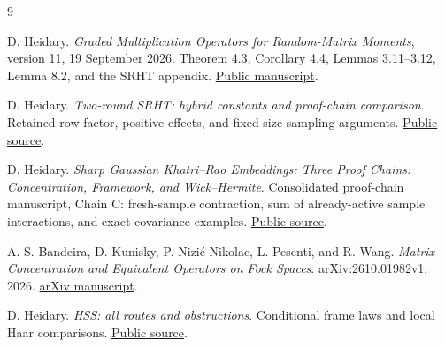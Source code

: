 \documentclass[11pt,a4paper]{article}
\theoremstyle{definition}\newtheorem{definition}[theorem]{Definition}
\theoremstyle{remark}\newtheorem{remark}[theorem]{Remark}
\numberwithin{equation}{section}
\begin{document}
\begin{thebibliography}{9}
D. Heidary.
\emph{Graded Multiplication Operators for Random-Matrix Moments},
version 11, 19 September 2026.
Theorem 4.3, Corollary 4.4, Lemmas 3.11--3.12, Lemma 8.2,
and the SRHT appendix.
\href{https://github.com/DiarHaidary/Results/blob/3a93d33c8b80326615b5b6e63654f3d84edf431d/Graded\%20Multiplication\%20Operators\%20for\%20Random-Matrix\%20Moments.pdf}{Public manuscript}.

D. Heidary.
\emph{Two-round SRHT: hybrid constants and proof-chain comparison}.
Retained row-factor, positive-effects, and fixed-size sampling arguments.
\href{https://github.com/DiarHaidary/Results/blob/3a93d33c8b80326615b5b6e63654f3d84edf431d/Wick-Hermite\%20Hybrid/srht_hybrid_constants_template.tex}{Public source}.

D. Heidary.
\emph{Sharp Gaussian Khatri--Rao Embeddings: Three Proof Chains:
Concentration, Framework, and Wick--Hermite}.
Consolidated proof-chain manuscript, Chain C: fresh-sample contraction,
sum of already-active sample interactions, and exact covariance examples.
\href{https://github.com/DiarHaidary/Results/blob/3a93d33c8b80326615b5b6e63654f3d84edf431d/Wick-Hermite\%20Hybrid/A\%20Tight\%20Analysis\%20of\%20Khatri-Rao\%20Oblivious\%20Subspace\%20Embeddings/khatri_rao_three_proof_chains_with_chainD_main.tex}{Public source}.

A. S. Bandeira, D. Kunisky, P. Nizi\'{c}-Nikolac, L. Pesenti,
and R. Wang.
\emph{Matrix Concentration and Equivalent Operators on Fock Spaces}.
arXiv:2610.01982v1, 2026.
\href{https://arxiv.org/abs/2610.01982v1}{arXiv manuscript}.

D. Heidary.
\emph{HSS: all routes and obstructions}.
Conditional frame laws and local Haar comparisons.
\href{https://github.com/DiarHaidary/Results/blob/3a93d33c8b80326615b5b6e63654f3d84edf431d/HSS/HSS\%20all\%20routes\%20and\%20obstructions.tex}{Public source}.
\end{thebibliography}
\end{document}
